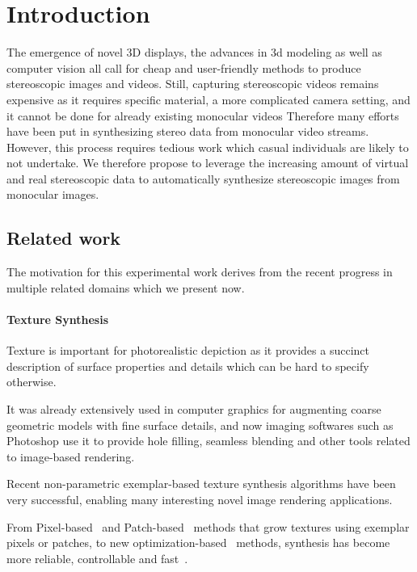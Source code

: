 

\section{Introduction}

The emergence of novel 3D displays, the advances in 3d modeling as well as computer vision all call for cheap and user-friendly methods to produce stereoscopic images and videos.
Still, capturing stereoscopic videos remains expensive as it requires specific material, a more complicated camera setting, and it cannot be done for already existing monocular videos
Therefore many efforts have been put in synthesizing stereo data from monocular video streams.
However, this process requires tedious work which casual individuals are likely to not undertake.
We therefore propose to leverage the increasing amount of virtual and real stereoscopic data to automatically synthesize stereoscopic images from monocular images.

\subsection{Related work}

The motivation for this experimental work derives from the recent progress in multiple related domains which we present now.

\paragraph{Texture Synthesis}
Texture is important for photorealistic depiction as it provides a succinct description of surface properties and details which can be hard to specify otherwise.
It was already extensively used in computer graphics for augmenting coarse geometric models with fine surface details, and now imaging softwares such as Photoshop use it to provide hole filling, seamless blending and other tools related to image-based rendering.

Recent non-parametric exemplar-based texture synthesis algorithms have been very successful, enabling many interesting novel image rendering applications.

From Pixel-based~\cite{Efros99, Wei00, Tong02} and Patch-based~\cite{Praun00, Efros01, Liang01, Kwatra03} methods that grow textures using exemplar pixels or patches, to new optimization-based~\cite{Kwatra05, Darabi12} methods, synthesis has become more reliable, controllable and fast~\cite{Ashikhmin01, Matusik05, Lefebvre06, Lu07}.

